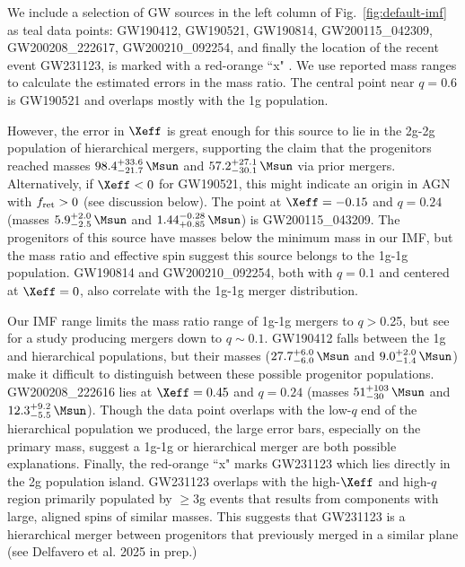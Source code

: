 We include a selection of GW sources in the left column of Fig.~\ref{fig:default-imf} as teal data points: GW190412, GW190521, GW190814, GW200115\_042309, GW200208\_222617, GW200210\_092254, 
and finally the location of the recent event  GW231123, is marked with a red-orange ``x"
\citep{Abbott+20-GW190521astro,Abbott+20-GW190521,Abbott+23-O3b,Abbot+24:GWTC-2.1,LVK+25-GW231123}.
We use reported mass ranges to calculate the estimated errors in the mass ratio.
The central point near $q=0.6$ is GW190521 and overlaps mostly with the 1g population.

However, the error in $\Xeff$ is great enough for this source to lie in the 2g-2g population of hierarchical mergers, supporting the claim that the progenitors reached masses $98.4_{-21.7}^{+33.6}\,\Msun$ and $57.2_{-30.1}^{+27.1}\,\Msun$ via prior mergers.
Alternatively, if $\Xeff<0$ for GW190521, this might indicate an origin in AGN with $f_{\rm ret}>0$ (see discussion below).
The point at $\Xeff=-0.15$ and $q=0.24$ (masses $5.9_{-2.5}^{+2.0}\,\Msun$ and $1.44_{+0.85}^{-0.28}\,\Msun$) is GW200115\_043209.
The progenitors of this source have masses below the minimum mass in our IMF, but the mass ratio and effective spin suggest this source belongs to the 1g-1g population.
GW190814 and GW200210\_092254, both with $q=0.1$ and centered at $\Xeff=0$, also correlate with the 1g-1g merger distribution.

Our IMF range limits the mass ratio range of 1g-1g mergers to $q>$0.25, but see \citet{Delfavero+25} for a study producing mergers down to $q \sim 0.1$.
GW190412 falls between the 1g and hierarchical populations, but their masses ($27.7_{-6.0}^{+6.0}\,\Msun$ and $9.0_{-1.4}^{+2.0}\,\Msun$) make it difficult to distinguish between these possible progenitor populations.
GW200208\_222616 lies at  $\Xeff=0.45$ and $q=0.24$ (masses $51_{-30}^{+103}\,\Msun$ and $12.3_{-5.5}^{+9.2}\,\Msun$).
Though the data point overlaps with the low-$q$ end of the hierarchical population we produced, the large error bars, especially on the primary mass, suggest a 1g-1g or hierarchical merger are both possible explanations.
Finally, the red-orange ``x" marks GW231123 \citep{LVK+25-GW231123} which lies directly in the 2g population island.
GW231123 overlaps with the high-$\Xeff$ and high-$q$ region primarily populated by $\geq$3g events that results from components with large, aligned spins of similar masses.
This suggests that GW231123 is a hierarchical merger between progenitors that previously merged in a similar plane (see Delfavero et al. 2025 in prep.)
 
